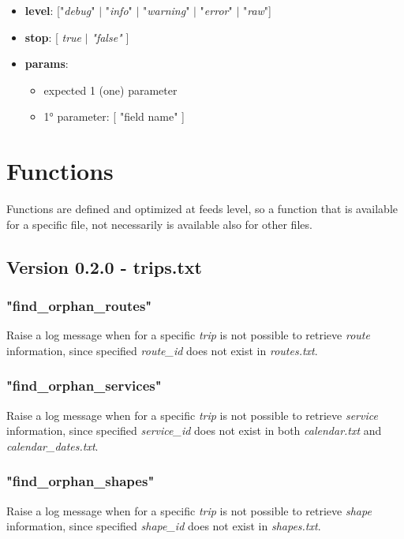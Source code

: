 \documentclass[12pt, a4paper]{book}
\begin{document}
\begin{itemize}
\item \textbf{level}: ["\textit{debug}" $|$ "\textit{info}" $|$ "\textit{warning}" $|$ "\textit{error}" $|$ "\textit{raw}"]
\item \textbf{stop}: [ \textit{true} $|$ \textit{"false"} ]
\item \textbf{params}: 
  \begin{itemize}
  \item expected 1 (one) parameter
  \item 1° parameter: [ "field name" ]
  \end{itemize}
\end{itemize}


\newpage
\section{Functions}

Functions are defined and optimized at feeds level, so a function that is available for a specific file, not necessarily is available also for other files.

\subsection{Version 0.2.0 - trips.txt}


\subsubsection{"find\_orphan\_routes"}
\begin{justify}
Raise a log message when for a specific \textit{trip} is not possible to retrieve \textit{route} information, since specified \textit{route\_id} does not exist in \textit{routes.txt}.
\newline
\end{justify}


\subsubsection{"find\_orphan\_services"}
\begin{justify}
Raise a log message when for a specific \textit{trip} is not possible to retrieve \textit{service} information, since specified \textit{service\_id} does not exist in both \textit{calendar.txt} and \textit{calendar\_dates.txt}.
\end{justify}


\subsubsection{"find\_orphan\_shapes"}
\begin{justify}
Raise a log message when for a specific \textit{trip} is not possible to retrieve \textit{shape} information, since specified \textit{shape\_id} does not exist in \textit{shapes.txt}.
\end{justify}
\end{document}
